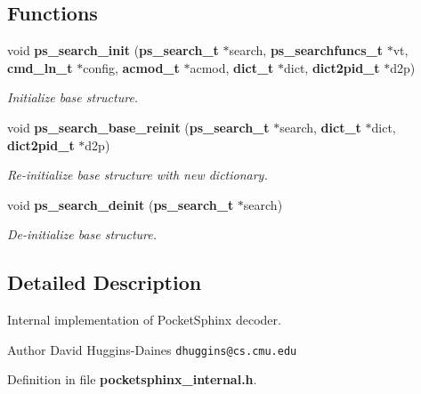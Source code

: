 \subsection*{Functions}
\begin{DoxyCompactItemize}
\item 
void {\bf ps\-\_\-search\-\_\-init} ({\bf ps\-\_\-search\-\_\-t} $\ast$search, {\bf ps\-\_\-searchfuncs\-\_\-t} $\ast$vt, {\bf cmd\-\_\-ln\-\_\-t} $\ast$config, {\bf acmod\-\_\-t} $\ast$acmod, {\bf dict\-\_\-t} $\ast$dict, {\bf dict2pid\-\_\-t} $\ast$d2p)\label{pocketsphinx__internal_8h_ad848d8d0cf0398542bfb74a2e34dbff3}

\begin{DoxyCompactList}\small\item\em Initialize base structure. \end{DoxyCompactList}\item 
void {\bf ps\-\_\-search\-\_\-base\-\_\-reinit} ({\bf ps\-\_\-search\-\_\-t} $\ast$search, {\bf dict\-\_\-t} $\ast$dict, {\bf dict2pid\-\_\-t} $\ast$d2p)\label{pocketsphinx__internal_8h_a307801961f27bd5f4b82a3e6b83e0ca1}

\begin{DoxyCompactList}\small\item\em Re-\/initialize base structure with new dictionary. \end{DoxyCompactList}\item 
void {\bf ps\-\_\-search\-\_\-deinit} ({\bf ps\-\_\-search\-\_\-t} $\ast$search)\label{pocketsphinx__internal_8h_a1299496b3498166928702d0701934e50}

\begin{DoxyCompactList}\small\item\em De-\/initialize base structure. \end{DoxyCompactList}\end{DoxyCompactItemize}


\subsection{Detailed Description}
Internal implementation of Pocket\-Sphinx decoder. \begin{DoxyAuthor}{Author}
David Huggins-\/\-Daines {\tt dhuggins@cs.\-cmu.\-edu} 
\end{DoxyAuthor}


Definition in file {\bf pocketsphinx\-\_\-internal.\-h}.

